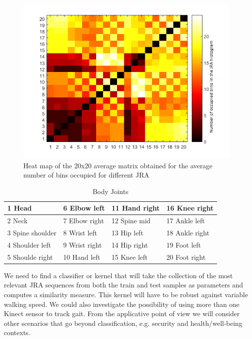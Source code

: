 \begin{figure}[h]
\centering
\includegraphics[scale=0.8]{heatMap.png}
\caption{Heat map of the 20x20 average matrix obtained for the average number of bins occupied for different JRA}
\end{figure}

\def\arraystretch{1.3}
\begin{table}[h]
\centering
\begin{tabular}{| p{3cm}| p{3cm}|p{3cm}| p{3cm}|}
 \hline
1 Head & 6 Elbow left & 11 Hand right & 16 Knee right  \\ \hline
2 Neck & 7 Elbow right & 12 Spine mid & 17 Ankle left  \\ \hline
3 Spine shoulder & 8 Wrist left & 13 Hip left & 18 Ankle right \\\hline
4 Shoulder left & 9 Wrist right & 14 Hip right & 19 Foot left \\ \hline
5 Shoulde right & 10 Hand left & 15 Knee left & 20 Foot right \\ \hline
\end{tabular}
\caption{ Body Joints}
\end{table}


\noindent We need to find a classifier or kernel that will take the collection of the most relevant JRA sequences from both the train and test samples as parameters and computes a similarity measure. This kernel will have to be robust against variable walking speed.
We could also investigate the possibility of using more than one Kinect sensor to track gait. From the applicative point of view we will consider other scenarios that go beyond classification, e.g. security and health/well-being contexts.
